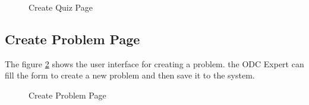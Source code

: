 \begin{figure}
  \centering
  \setlength\fboxsep{0pt} %
  \setlength\fboxrule{2pt} %
  \caption{Create Quiz Page}\label{Create Quiz Page}
\end{figure}

\subsection{Create Problem Page}
The figure \ref{Create Problem Page} shows the user interface for creating a problem.
the ODC Expert can fill the form to create a new problem and then save it to the system.

\begin{figure}
  \centering
  \setlength\fboxsep{0pt} %
  \setlength\fboxrule{2pt} %
  \caption{Create Problem Page}\label{Create Problem Page}
\end{figure}

